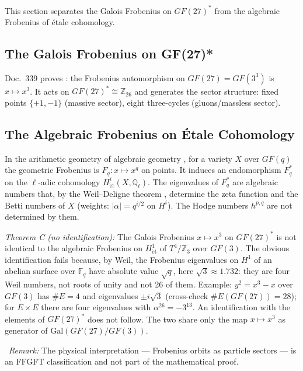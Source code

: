 This section separates the Galois Frobenius on $GF(27)^*$ from the
algebraic Frobenius of étale cohomology.

\subsection{The Galois Frobenius on GF(27)*}

Doc.~339 proves \BM: the Frobenius automorphism on $GF(27) = GF(3^3)$ is
$x \mapsto x^3$. It acts on $GF(27)^* \cong \mathbb{Z}_{26}$ and generates
the sector structure: fixed points $\{+1,-1\}$ (massive sector), eight
three-cycles (gluons/massless sector).

\subsection{The Algebraic Frobenius on Étale Cohomology}

In the arithmetic geometry of algebraic geometry \QM, for a variety $X$
over $GF(q)$ the geometric Frobenius is $F_q: x \mapsto x^q$ on points. It
induces an endomorphism $F_q^*$ on the $\ell$-adic cohomology
$H^i_{\mathrm{\acute{e}t}}(X,\mathbb{Q}_\ell)$. The eigenvalues of $F_q^*$
are algebraic numbers that, by the Weil--Deligne theorem \EM, determine the
zeta function and the Betti numbers of $X$ (weights: $|\alpha| = q^{i/2}$ on $H^i$).
The Hodge numbers $h^{p,q}$ are not determined by them.

\textit{Theorem C (no identification):} The Galois Frobenius $x \mapsto x^3$
on $GF(27)^*$ is not identical to the algebraic Frobenius on
$H^1_{\mathrm{\acute{e}t}}$ of $T^4/\mathbb{Z}_3$ over $GF(3)$. The obvious
identification fails because, by Weil, the Frobenius eigenvalues on $H^1$ of
an abelian surface over $\mathbb{F}_q$ have absolute value $\sqrt{q}$, here
$\sqrt{3} \approx 1.732$: they are four Weil numbers, not roots of unity and
not 26 of them. Example: $y^2 = x^3 - x$ over $GF(3)$ has $\#E = 4$ and
eigenvalues $\pm i\sqrt{3}$ (cross-check $\#E(GF(27)) = 28$); for $E\times E$
there are four eigenvalues with $\alpha^{26} = -3^{13}$. An identification
with the elements of $GF(27)^*$ does not follow. The two share only the map
$x \mapsto x^3$ as generator of $\mathrm{Gal}(GF(27)/GF(3))$.

\SM\ \textit{Remark:} The physical interpretation — Frobenius orbits as
particle sectors — is an FFGFT classification and not part of the mathematical
proof.

